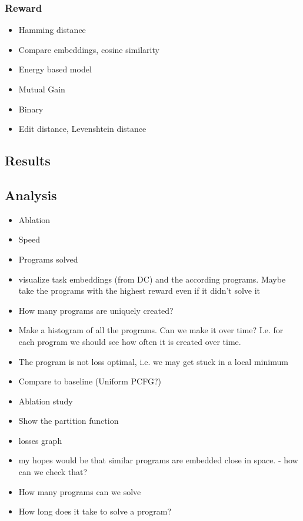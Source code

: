 \subsubsection{Reward}
\begin{itemize}
    \item Hamming distance
    \item Compare embeddings, cosine similarity
    \item Energy based model
    \item Mutual Gain
    \item Binary
    \item Edit distance, Levenshtein distance
\end{itemize}

\subsection{Results}

\subsection{Analysis}
\begin{itemize}
    \item Ablation
    \item Speed
    \item Programs solved
    \item visualize task embeddings (from DC) and the according programs. Maybe take the programs with the highest reward even if it didn't solve it
    \item How many programs are uniquely created?
	\item Make a histogram of all the programs. Can we make it over time? I.e. for each program we should see how often it is created over time. 
    \item The program is not loss optimal, i.e. we may get stuck in a local minimum
    \item Compare to baseline (Uniform PCFG?)
    \item Ablation study
    \item Show the partition function 
    \item losses graph
    \item my hopes would be that similar programs are embedded close in space. - how can we check that?
    \item How many programs can we solve 
    \item How long does it take to solve a program?

\end{itemize}

